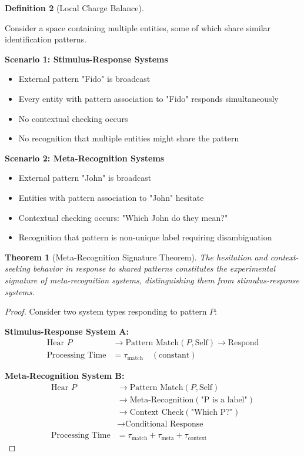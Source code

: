 \documentclass[12pt,a4paper]{article}
\theoremstyle{plain}
\newtheorem{theorem}{Theorem}[section]
\theoremstyle{definition}
\newtheorem{definition}[theorem]{Definition}
\theoremstyle{remark}
\begin{document}
\begin{definition}[Local Charge Balance]
\begin{observation}
Consider a space containing multiple entities, some of which share similar identification patterns.

\textbf{Scenario 1: Stimulus-Response Systems}
\begin{itemize}
\item External pattern "Fido" is broadcast
\item Every entity with pattern association to "Fido" responds simultaneously
\item No contextual checking occurs
\item No recognition that multiple entities might share the pattern
\end{itemize}

\textbf{Scenario 2: Meta-Recognition Systems}
\begin{itemize}
\item External pattern "John" is broadcast
\item Entities with pattern association to "John" hesitate
\item Contextual checking occurs: "Which John do they mean?"
\item Recognition that pattern is non-unique label requiring disambiguation
\end{itemize}
\end{observation}

\begin{theorem}[Meta-Recognition Signature Theorem]
The hesitation and context-seeking behavior in response to shared patterns constitutes the experimental signature of meta-recognition systems, distinguishing them from stimulus-response systems.
\end{theorem}

\begin{proof}
Consider two system types responding to pattern $P$:

\textbf{Stimulus-Response System A:}
\begin{align}
\text{Hear } P &\rightarrow \text{Pattern Match}(P, \text{Self}) \rightarrow \text{Respond} \\
\text{Processing Time} &= \tau_{\text{match}} \quad (\text{constant})
\end{align}

\textbf{Meta-Recognition System B:}
\begin{align}
\text{Hear } P &\rightarrow \text{Pattern Match}(P, \text{Self}) \\
&\rightarrow \text{Meta-Recognition}(\text{"P is a label"}) \\
&\rightarrow \text{Context Check}(\text{"Which P?"}) \\
&\rightarrow \text{Conditional Response} \\
\text{Processing Time} &= \tau_{\text{match}} + \tau_{\text{meta}} + \tau_{\text{context}}
\end{align}


\end{proof}
\end{definition}
\end{document}
